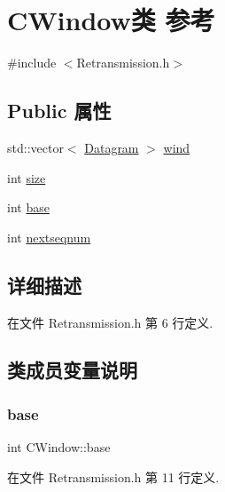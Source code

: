 \hypertarget{class_c_window}{}\section{C\+Window类 参考}
\label{class_c_window}


{\ttfamily \#include $<$Retransmission.\+h$>$}

\subsection*{Public 属性}
\begin{DoxyCompactItemize}
\item 
std\+::vector$<$ \hyperlink{class_datagram}{Datagram} $>$ \hyperlink{class_c_window_adcdfe4662a9ee3e2dca546b3fcb1246b}{wind}
\item 
int \hyperlink{class_c_window_a2784e1ec4cb2d6ae7fb90689784eefca}{size}
\item 
int \hyperlink{class_c_window_a3c8f70c5a65a626d9640050bbc260841}{base}
\item 
int \hyperlink{class_c_window_a11213b0138731799abc3855709124482}{nextseqnum}
\end{DoxyCompactItemize}


\subsection{详细描述}


在文件 Retransmission.\+h 第 6 行定义.



\subsection{类成员变量说明}
\mbox{\label{class_c_window_a3c8f70c5a65a626d9640050bbc260841}} 
\subsubsection{\texorpdfstring{base}{base}}
{\footnotesize\ttfamily int C\+Window\+::base}



在文件 Retransmission.\+h 第 11 行定义.

\mbox{\label{class_c_window_a11213b0138731799abc3855709124482}} 
